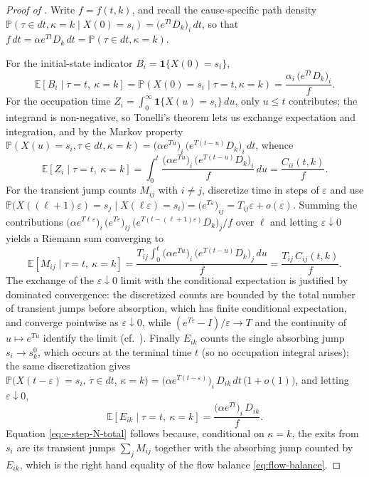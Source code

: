 \documentclass{article}
\newcommand{\Prob}{\mathbb{P}}
\newcommand{\ex}[1]{\mathbb{E}\left[#1\right]}
\begin{document}
\begin{proof}[Proof of ]
Write $f=f(t,k)$, and recall the cause-specific path density $\Prob(\tau\in dt,\kappa=k\mid X(0)=s_i)=\big(e^{Tt}D_k\big)_i\,dt$, so that $f\,dt = \alpha e^{Tt}D_k\,dt = \Prob(\tau\in dt,\kappa=k)$.

For the initial-state indicator $B_i=\mathbf 1\{X(0)=s_i\}$,
\[
\ex{B_i \mid \tau=t,\ \kappa=k}=\Prob(X(0)=s_i\mid \tau=t,\kappa=k)
=\frac{\alpha_i\,\big(e^{Tt}D_k\big)_i}{f}.
\]
For the occupation time $Z_i=\int_0^\infty \mathbf 1\{X(u)=s_i\}\,du$, only $u\le t$ contributes; the integrand is non-negative, so Tonelli's theorem lets us exchange expectation and integration, and by the Markov property $\Prob(X(u)=s_i,\tau\in dt,\kappa=k)=\big(\alpha e^{Tu}\big)_i\,\big(e^{T(t-u)}D_k\big)_i\,dt$, whence
\[
\ex{Z_i \mid \tau=t,\ \kappa=k}=\int_0^t \frac{\big(\alpha e^{Tu}\big)_i\,\big(e^{T(t-u)}D_k\big)_i}{f}\,du=\frac{C_{ii}(t,k)}{f}.
\]
For the transient jump counts $M_{ij}$ with $i\neq j$, discretize time in steps of $\varepsilon$ and use $\Prob\big(X((\ell{+}1)\varepsilon)=s_j\mid X(\ell\varepsilon)=s_i\big)=\big(e^{T\varepsilon}\big)_{ij}=T_{ij}\varepsilon+o(\varepsilon)$. Summing the contributions $\big(\alpha e^{T\ell\varepsilon}\big)_i\,\big(e^{T\varepsilon}\big)_{ij}\,\big(e^{T(t-(\ell+1)\varepsilon)}D_k\big)_j/f$ over $\ell$ and letting $\varepsilon\downarrow0$ yields a Riemann sum converging to
\[
\ex{M_{ij} \mid \tau=t,\ \kappa=k}=\frac{T_{ij}\displaystyle\int_0^t \big(\alpha e^{Tu}\big)_i\,\big(e^{T(t-u)}D_k\big)_j\,du}{f}=\frac{T_{ij}\,C_{ij}(t,k)}{f}.
\]
The exchange of the $\varepsilon\downarrow0$ limit with the conditional expectation is justified by dominated convergence: the discretized counts are bounded by the total number of transient jumps before absorption, which has finite conditional expectation, and converge pointwise as $\varepsilon\downarrow0$, while $(e^{T\varepsilon}-I)/\varepsilon\to T$ and the continuity of $u\mapsto e^{Tu}$ identify the limit (cf.\ \citet{Asmussen1996FittingPD}).
Finally $E_{ik}$ counts the single absorbing jump $s_i\to s_k^0$, which occurs at the terminal time $t$ (so no occupation integral arises); the same discretization gives $\Prob\big(X(t-\varepsilon)=s_i,\,\tau\in dt,\,\kappa=k\big)=\big(\alpha e^{T(t-\varepsilon)}\big)_i\,D_{ik}\,dt\,\big(1+o(1)\big)$, and letting $\varepsilon\downarrow0$,
\[
\ex{E_{ik} \mid \tau=t,\ \kappa=k}=\frac{\big(\alpha e^{Tt}\big)_i\,D_{ik}}{f}.
\]
Equation \eqref{eq:e-step-N-total} follows because, conditional on $\kappa=k$, the exits from $s_i$ are its transient jumps $\sum_j M_{ij}$ together with the absorbing jump counted by $E_{ik}$, which is the right hand equality of the flow balance \eqref{eq:flow-balance}.
\end{proof}
\end{document}

